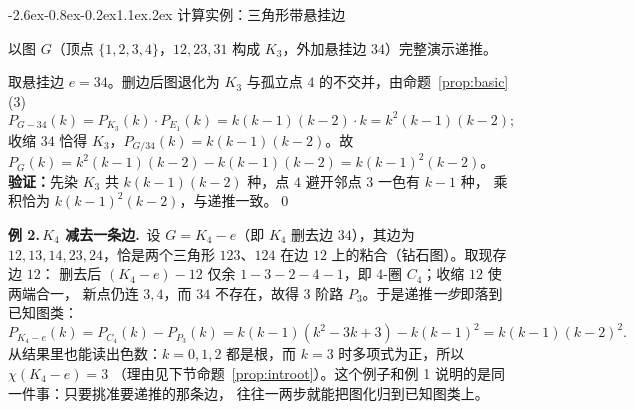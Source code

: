 \documentclass[10pt]{article}
\makeatletter
\renewcommand\section{\@startsection{section}{1}{\z@}%
  {-2.6ex\@plus -0.8ex\@minus -0.2ex}{1.1ex\@plus.2ex}%
  {\normalfont\large\bfseries}}
\newcommand{\chrom}[2]{P_{#1}(#2)}        %
\newcommand{\chrnum}{\chi}                %
\makeatother
\begin{document}
\section{计算实例：三角形带悬挂边}\label{sec:example}

以图 $G$（顶点 $\{1,2,3,4\}$，$12,23,31$ 构成 $K_3$，外加悬挂边 $34$）完整演示递推。

\begin{center}
\end{center}

取悬挂边 $e=34$。删边后图退化为 $K_3$ 与孤立点 $4$ 的不交并，由命题~\ref{prop:basic}(3)
\[
  \chrom{G-34}{k}=\chrom{K_3}{k}\cdot\chrom{E_1}{k}=k(k-1)(k-2)\cdot k=k^{2}(k-1)(k-2);
\]
收缩 $34$ 恰得 $K_3$，$\chrom{G/34}{k}=k(k-1)(k-2)$。故
$\chrom{G}{k}=k^{2}(k-1)(k-2)-k(k-1)(k-2)=k(k-1)^{2}(k-2)$。
\textbf{验证：}先染 $K_3$ 共 $k(k-1)(k-2)$ 种，点 $4$ 避开邻点 $3$ 一色有 $k-1$ 种，
乘积恰为 $k(k-1)^{2}(k-2)$，与递推一致。\qed

\textbf{例 2.\,$K_4$ 减去一条边.}\, 设 $G=K_4-e$（即 $K_4$ 删去边 $34$），其边为
$12,13,14,23,24$，恰是两个三角形 $123$、$124$ 在边 $12$ 上的粘合（钻石图）。取现存边 $12$：
删去后 $(K_4-e)-12$ 仅余 $1\!-\!3\!-\!2\!-\!4\!-\!1$，即 $4$-圈 $C_4$；收缩 $12$ 使两端合一，
新点仍连 $3,4$，而 $34$ 不存在，故得 $3$ 阶路 $P_3$。于是递推\emph{一步}即落到已知图类：
\[
  \chrom{K_4-e}{k}=\chrom{C_4}{k}-\chrom{P_3}{k}
  =k(k-1)(k^{2}-3k+3)-k(k-1)^{2}=k(k-1)(k-2)^{2}.
\]
从结果里也能读出色数：$k=0,1,2$ 都是根，而 $k=3$ 时多项式为正，所以 $\chrnum(K_4-e)=3$
（理由见下节命题~\ref{prop:introot}）。这个例子和例 1 说明的是同一件事：只要挑准要递推的那条边，
往往一两步就能把图化归到已知图类上。
\end{document}
